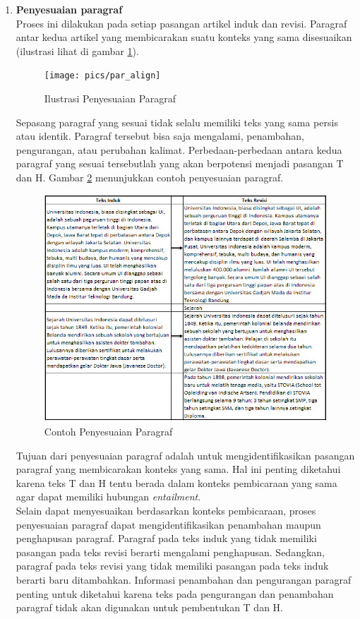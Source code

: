 \begin{enumerate}
	\item \textbf{Penyesuaian paragraf}\\
	Proses ini dilakukan pada setiap pasangan artikel induk dan revisi. Paragraf antar kedua artikel yang membicarakan suatu konteks yang sama disesuaikan (ilustrasi lihat di gambar \ref{fig:par_align}).
	\begin{figure}
		\centering
		\texttt{[image: pics/par\_align]}
		\caption{Ilustrasi Penyesuaian Paragraf}
		\label{fig:par_align}
	\end{figure}
	Sepasang paragraf yang sesuai tidak selalu memiliki teks yang sama persis atau identik. Paragraf tersebut bisa saja mengalami, penambahan, pengurangan, atau perubahan kalimat. Perbedaan-perbedaan antara kedua paragraf yang sesuai tersebutlah yang akan berpotensi menjadi pasangan T dan H. Gambar \ref{fig:contoh-penyesuaian-par} menunjukkan contoh penyesuaian paragraf.
	\begin{figure}
		\centering
		\includegraphics[width=0.85\linewidth]{pics/contoh-penyesuaian-par}
		\caption{Contoh Penyesuaian Paragraf}
		\label{fig:contoh-penyesuaian-par}
	\end{figure}
	Tujuan dari penyesuaian paragraf adalah untuk mengidentifikasikan pasangan paragraf yang membicarakan konteks yang sama. Hal ini penting diketahui karena teks T dan H tentu berada dalam konteks pembicaraan yang sama agar dapat memiliki hubungan \textit{entailment}.\\
	Selain dapat menyesuaikan berdasarkan konteks pembicaraan, proses penyesuaian paragraf dapat mengidentifikasikan penambahan maupun penghapusan paragraf. Paragraf pada teks induk yang tidak memiliki pasangan pada teks revisi berarti mengalami penghapusan. Sedangkan, paragraf pada teks revisi yang tidak memiliki pasangan pada teks induk berarti baru ditambahkan. Informasi penambahan dan pengurangan paragraf penting untuk diketahui karena teks pada pengurangan dan penambahan paragraf tidak akan digunakan untuk pembentukan T dan H. 
	

\end{enumerate}
